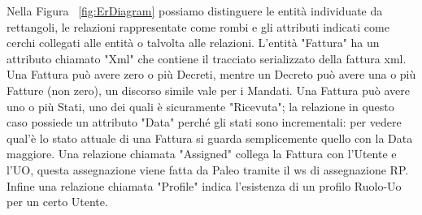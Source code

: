 Nella Figura ~\ref{fig:ErDiagram} possiamo distinguere le entità individuate da rettangoli, le relazioni rappresentate come rombi e gli attributi indicati come cerchi collegati alle entità o talvolta alle relazioni.
L'entità "Fattura" ha un attributo chiamato "Xml" che contiene il tracciato serializzato della fattura \Gls{xml}.
Una Fattura può avere zero o più Decreti, mentre un Decreto può avere una o più Fatture (non zero), un discorso simile vale per i Mandati.
Una Fattura può avere uno o più Stati, uno dei quali è sicuramente "Ricevuta"; la relazione in questo caso possiede un attributo "Data" perché gli stati sono incrementali: per vedere qual'è lo stato attuale di una Fattura si guarda semplicemente quello con la Data maggiore.
Una relazione chiamata "Assigned" collega la Fattura con l'Utente e l'UO, questa assegnazione viene fatta da Paleo tramite il \Gls{ws} di assegnazione RP.
Infine una relazione chiamata "Profile" indica l'esistenza di un profilo Ruolo-Uo per un certo Utente.